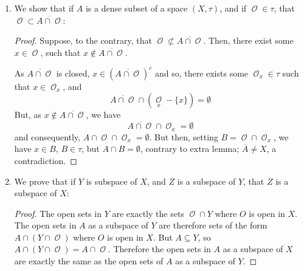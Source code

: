 \documentclass{book}
\DeclareMathOperator*{\Ocal}{\mathcal{O}}
\begin{document}
\begin{enumerate}[(1)]
    \item We show that if $A$ is a dense subset of a space $(X, \tau)$, and if ${\Ocal} \in \tau$, that ${\Ocal} \subset \overline{A \cap {\Ocal}}$:
        \begin{proof} Suppose, to the contrary, that ${\Ocal} \not\subset \overline{A \cap {\Ocal}}$. Then, there exist some $x \in {\Ocal}$, such that $x \notin \overline{A \cap {\Ocal}}$.
            \par As $\overline{A \cap {\Ocal}}$ is closed, $x \in (\overline{A \cap {\Ocal}})^c$ and so,  there exists some ${\Ocal}_x \in \tau$ such that $x \in {\Ocal}_x$, and 
            \[\overline{A \cap {\Ocal}} \cap (\underset{x}{\Ocal} - \{x\}) = \emptyset \]
            But, as $x \notin \overline{A \cap {\Ocal}}$, we have 
            \[ \overline{A \cap {\Ocal}} \cap {\Ocal}_x = \emptyset \]
            and consequently, $A \cap {\Ocal} \cap {\Ocal}_x = \emptyset$. But then, setting $B = {\Ocal} \cap {\Ocal}_x$, we have $x \in B$, $B \in \tau$, but $A \cap B = \emptyset$, contrary to extra lemma; $\overline{A} \neq X$, a contradiction. 
        \end{proof}


    \item We prove that if $Y$ is subspace of $X$, and $Z$ is a subspace of $Y$, that $Z$ is a subspace of $X$: 
        \begin{proof} The open sets in $Y$ are exactly the sets $\Ocal \cap Y$ where $O$ is open in $X$.  The open sets in $A$ as a subspace of $Y$ are therefore sets of the form $A\cap(Y\cap \Ocal)$ where $O$ is open in $X$.  But $A\subseteq Y$, so $A\cap(Y\cap \Ocal)=A\cap \Ocal$.  Therefore the open sets in $A$ as a subspace of $X$ are exactly the same as the open sets of $A$ as a subspace of $Y$.
        \end{proof}


\end{enumerate}
\end{document}
